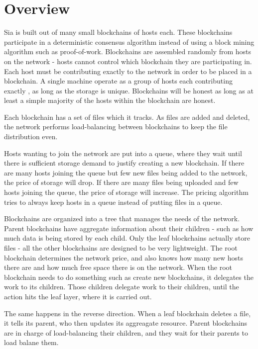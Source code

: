 \documentclass[twocolumn]{article}
\begin{document}
\section{Overview}

Sia is built out of many small blockchains of \numhosts{} hosts each.
These blockchains participate in a deterministic consensus algorithm instead of using a block mining algorithm such as proof-of-work.
Blockchains are assembled randomly from hosts on the network - hosts cannot control which blockchain they are participating in.
Each host must be contributing exactly \storageperhost{} to the network in order to be placed in a blockchain.
A single machine operate as a group of hosts each contributing exactly \storageperhost{}, as long as the storage is unique.
Blockchains will be honest as long as at least a simple majority of the hosts within the blockchain are honest.

Each blockchain has a set of files which it tracks.
As files are added and deleted, the network performs load-balancing between blockchains to keep the file distribution even.

Hosts wanting to join the network are put into a queue, where they wait until there is sufficient storage demand to justify creating a new blockchain.
If there are many hosts joining the queue but few new files being added to the network, the price of storage will drop.
If there are many files being uploaded and few hosts joining the queue, the price of storage will increase.
The pricing algorithm tries to always keep hosts in a queue instead of putting files in a queue.

Blockchains are organized into a tree that manages the needs of the network.
Parent blockchains have aggregate information about their children - such as how much data is being stored by each child.
Only the leaf blockchains actually store files - all the other blockchains are designed to be very lightweight.
The root blockchain determines the network price, and also knows how many new hosts there are and how much free space there is on the network.
When the root blockchain needs to do something such as create new blockchains, it delegates the work to its children.
Those children delegate work to their children, until the action hits the leaf layer, where it is carried out.

The same happens in the reverse direction.
When a leaf blockchain deletes a file, it tells its parent, who then updates its aggreagate resource.
Parent blockchains are in charge of load-balancing their children, and they wait for their parents to load balane them.
\end{document}
